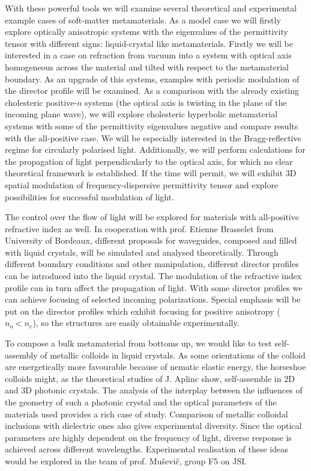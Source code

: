\documentclass[a4paper,11pt]{article}
\begin{document}
With these powerful tools we will examine several theoretical and experimental example cases of soft-matter metamaterials. 
As a model case we will firstly explore optically anisotropic systems with the eigenvalues of the permittivity tensor with different signs: liquid-crystal like metamaterials. 
Firstly we will be interested in a case on refraction from vacuum into a system with optical axis homogeneous across the material and tilted with respect to the metamaterial boundary. 
As an upgrade of this systems, examples with periodic modulation of the director profile will be examined. 
As a comparison with the already existing cholesteric positive-$n$ systems (the optical axis is twisting in the plane of the incoming plane wave), we will explore cholesteric hyperbolic metamaterial systems with some of the permittivity eigenvalues negative and compare results with the all-positive case. 
We will be especially interested in the Bragg-reflective regime for circularly polarised light. 
Additionally, we will perform calculations for the propagation of light perpendicularly to the optical axis, for which no clear theoretical framework is established. 
If the time will permit, we will exhibit 3D spatial modulation of frequency-dispersive permittivity tensor and explore possibilities for successful modulation of light.  


The control over the flow of light will be explored for materials with all-positive refractive index as well. 
In cooperation with prof. Etienne Brasselet from University of Bordeaux, different proposals for waveguides, composed and filled with liquid crystals, will be simulated and analysed theoretically. 
Through different boundary conditions and other manipulation, different director profiles can be introduced into the liquid crystal. 
The modulation of the refractive index profile can in turn affect the propagation of light. 
With some director profiles we can achieve focusing of selected incoming polarizations.
Special emphasis will be put on the director profiles which exhibit focusing for positive anisotropy ($n_{o} < n_e$), so the structures are easily obtainable experimentally. 


To compose a bulk metamaterial from bottoms up, we would like to test self-assembly of metallic colloids in liquid crystals.
As some orientations of the colloid are energetically more favourable because of nematic elastic energy, the horseshoe colloids might, as the theoretical studies of J. Aplinc \cite{jure-HS} show, self-assemble in 2D and 3D photonic crystals. 
The analysis of the interplay between the influences of the geometry of such a photonic crystal and the optical parameters of the materials used provides a rich case of study. 
Comparison of metallic colloidal inclusions with dielectric ones also gives experimental diversity. 
Since the optical parameters are highly dependent on the frequency of light, diverse response is achieved across different wavelengths. 
Experimental realisation of these ideas would be explored in the team of prof. Muševič, group F5 on JSI. 
\end{document}
